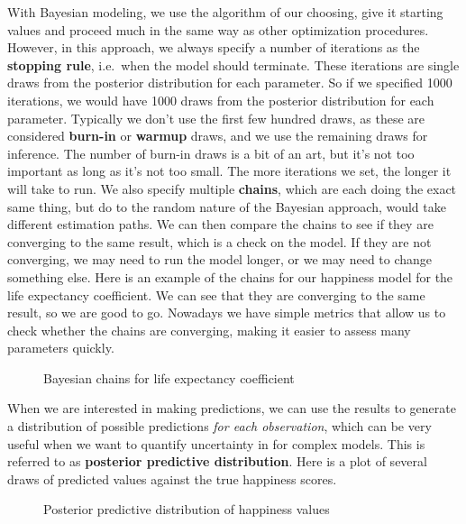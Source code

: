 \documentclass[
  letterpaper,
]{krantz}
\begin{document}
With Bayesian modeling, we use the algorithm of our choosing, give it
starting values and proceed much in the same way as other optimization
procedures. However, in this approach, we always specify a number of
iterations as the \textbf{stopping rule}, i.e.~when the model should
terminate. These iterations are single draws from the posterior
distribution for each parameter. So if we specified 1000 iterations, we
would have 1000 draws from the posterior distribution for each
parameter. Typically we don't use the first few hundred draws, as these
are considered \textbf{burn-in} or \textbf{warmup} draws, and we use the
remaining draws for inference. The number of burn-in draws is a bit of
an art, but it's not too important as long as it's not too small. The
more iterations we set, the longer it will take to run. We also specify
multiple \textbf{chains}, which are each doing the exact same thing, but
do to the random nature of the Bayesian approach, would take different
estimation paths. We can then compare the chains to see if they are
converging to the same result, which is a check on the model. If they
are not converging, we may need to run the model longer, or we may need
to change something else. Here is an example of the chains for our
happiness model for the life expectancy coefficient. We can see that
they are converging to the same result, so we are good to go. Nowadays
we have simple metrics that allow us to check whether the chains are
converging, making it easier to assess many parameters quickly.

\begin{figure}[H]


\caption{\label{fig-r-bayesian-chains}Bayesian chains for life
expectancy coefficient}

\end{figure}%

When we are interested in making predictions, we can use the results to
generate a distribution of possible predictions \emph{for each
observation}, which can be very useful when we want to quantify
uncertainty in for complex models. This is referred to as
\textbf{posterior predictive distribution}. Here is a plot of several
draws of predicted values against the true happiness scores.

\begin{figure}[H]


\caption{\label{fig-r-bayesian-posterior-predictive}Posterior predictive
distribution of happiness values}

\end{figure}%
\end{document}
